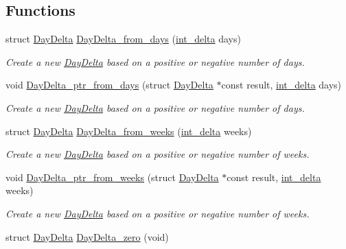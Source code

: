 \subsection*{Functions}
\begin{DoxyCompactItemize}
\item 
struct \hyperlink{structDayDelta}{Day\-Delta} \hyperlink{day-delta_8h_a50a5b111e380372e918e4d67f4b1814d}{Day\-Delta\-\_\-from\-\_\-days} (\hyperlink{types_8h_a8a67cf99971c5cfeeaa2380ba84a4c92}{int\-\_\-delta} days)
\begin{DoxyCompactList}\small\item\em Create a new \hyperlink{structDayDelta}{Day\-Delta} based on a positive or negative number of days. \end{DoxyCompactList}\item 
void \hyperlink{day-delta_8h_a196d880e550d8423bc6314894010e744}{Day\-Delta\-\_\-ptr\-\_\-from\-\_\-days} (struct \hyperlink{structDayDelta}{Day\-Delta} $\ast$const result, \hyperlink{types_8h_a8a67cf99971c5cfeeaa2380ba84a4c92}{int\-\_\-delta} days)
\begin{DoxyCompactList}\small\item\em Create a new \hyperlink{structDayDelta}{Day\-Delta} based on a positive or negative number of days. \end{DoxyCompactList}\item 
struct \hyperlink{structDayDelta}{Day\-Delta} \hyperlink{day-delta_8h_ac44c70541cf4f255f25384194341ff07}{Day\-Delta\-\_\-from\-\_\-weeks} (\hyperlink{types_8h_a8a67cf99971c5cfeeaa2380ba84a4c92}{int\-\_\-delta} weeks)
\begin{DoxyCompactList}\small\item\em Create a new \hyperlink{structDayDelta}{Day\-Delta} based on a positive or negative number of weeks. \end{DoxyCompactList}\item 
void \hyperlink{day-delta_8h_a6a006f452867d3828a3eb69a8f5ba1dd}{Day\-Delta\-\_\-ptr\-\_\-from\-\_\-weeks} (struct \hyperlink{structDayDelta}{Day\-Delta} $\ast$const result, \hyperlink{types_8h_a8a67cf99971c5cfeeaa2380ba84a4c92}{int\-\_\-delta} weeks)
\begin{DoxyCompactList}\small\item\em Create a new \hyperlink{structDayDelta}{Day\-Delta} based on a positive or negative number of weeks. \end{DoxyCompactList}\item 
struct \hyperlink{structDayDelta}{Day\-Delta} \hyperlink{day-delta_8h_af53928d9c3fe865087e911fb91e435fe}{Day\-Delta\-\_\-zero} (void)

\end{DoxyCompactItemize}

